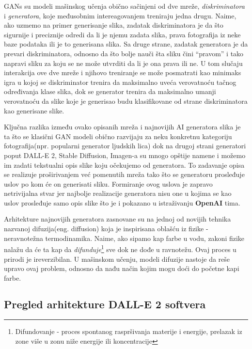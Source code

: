 \documentclass[12pt, letterpaper]{article}
\begin{document}
GANs su modeli mašinskog učenja obično sačinjeni od dve mreže, \textit{diskriminatora} i \textit{generatora}, koje međusobnim intereagovanjem treniraju jedna drugu. Naime, ako uzmemo na primer generisanje slika, zadatak diskriminatora je da što sigurnije i preciznije odredi da li je njemu zadata slika, prava fotografija iz neke baze podataka ili je to generisana slika. Sa druge strane, zadatak generatora je da prevari diskriminatora, odnosno da što bolje nauči šta sliku čini “pravom” i tako napravi sliku za koju se ne može utvrditi da li je ona prava ili ne. U tom slučaju interakcija ove dve mreže i njihovo treniranje se može posmatrati kao minimaks igra u kojoj se diskriminator trenira da maksimalno uveća verovatnoću tačnog određivanja klase slika, dok se generator trenira da maksimalno umanji verovatnoću da slike koje je generisao budu klasifikovane od strane diskriminatora kao generisane slike.\cite{gan1, gan2, ganvideo}

Ključna razlika između ovako opisanih mreža i najnovijih AI generatora slika je ta što se klasični GAN modeli obično razvijaju za neku konkretnu kategoriju fotografija(npr. popularni generator ljudskih lica)\cite{gen1} dok na drugoj strani generatori poput DALL-E 2, Stable Diffusion, Imagen-a su mnogo opštije namene i možemo im zadati tekstualni opis slike koju očekujemo od generatora. To zadavanje opisa se realizuje proširivanjem već pomenutih mreža tako što se generatoru prosleđuje uslov po kom će on generisati sliku.\cite{openai_dali, openai_glide, asembli} 
Formiranje ovog uslova je zapravo netrivijalna stvar jer najbolje realizacije generatora nisu one u kojima se kao uslov prosleđuje samo opis slike što je i pokazano u istraživanju \textbf{OpenAI} tima.\cite{openai_dali}

Arhitekture najnovijih generatora zasnovane su na jednoj od novijih tehnika nazvanoj difuzija(eng. diffusion) koja je inspirisana oblašću iz fizike - neravnotežna termodinamika. Naime, ako sipamo kap farbe u vodu, zakoni fizike nalažu da će ta kap da \textit{difunduje}\footnote{Difundovanje - proces spontanog raspršivanja materije i energije, prelazak iz zone više u zonu niže energije ili koncentracije} sve dok ne dođe u ravnotežu. Ovaj proces u prirodi je ireverzibilan. U mašinskom učenju, modeli difuzije nastoje da reše upravo ovaj problem, odnosno da nađu način kojim mogu doći do početne kapi farbe.\cite{asembli}

\subsection{Pregled arhitekture DALL-E 2 softvera}
\end{document}
